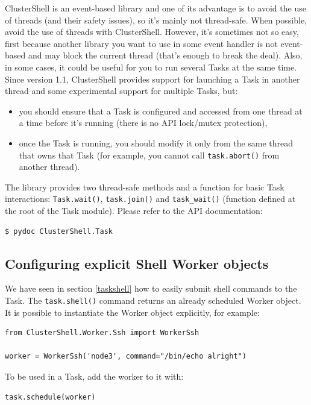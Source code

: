 \documentclass[english,a4paper]{csuserguide}
\begin{document}
ClusterShell is an event-based library and one of its advantage is to avoid the use of threads (and their safety issues), so it's mainly not thread-safe. When possible, avoid the use of threads with ClusterShell. However, it's sometimes not so easy, first because another library you want to use in some event handler is not event-based and may block the current thread (that's enough to break the deal). Also, in some cases, it could be useful for you to run several Tasks at the same time. Since version 1.1, ClusterShell provides support for launching a Task in another thread and some experimental support for multiple Tasks, but:
\begin{itemize}
\item you should ensure that a Task is configured and accessed from one thread at a time before it's running (there is no API lock/mutex protection),
\item once the Task is running, you should modify it only from the same thread that owns that Task (for example, you cannot call \lstinline+task.abort()+ from another thread).
\end{itemize}
The library provides two thread-safe methods and a function for basic Task interactions: \lstinline+Task.wait()+, \lstinline+task.join()+ and \lstinline+task_wait()+ (function defined at the root of the Task module). Please refer to the API documentation:
\begin{verbatim}
$ pydoc ClusterShell.Task
\end{verbatim}

\subsection{Configuring explicit Shell Worker objects}

We have seen in section \ref{taskshell} how to easily submit shell commands to the Task. The \lstinline+task.shell()+ command returns an already scheduled Worker object. It is possible to instantiate the Worker object explicitly, for example:
\medskip
\begin{lstlisting}[breaklines=true, breakatwhitespace=true]
from ClusterShell.Worker.Ssh import WorkerSsh

worker = WorkerSsh('node3', command="/bin/echo alright")
\end{lstlisting}

To be used in a Task, add the worker to it with:
\medskip
\begin{lstlisting}[breaklines=true, breakatwhitespace=true]
task.schedule(worker)
\end{lstlisting}
\end{document}
